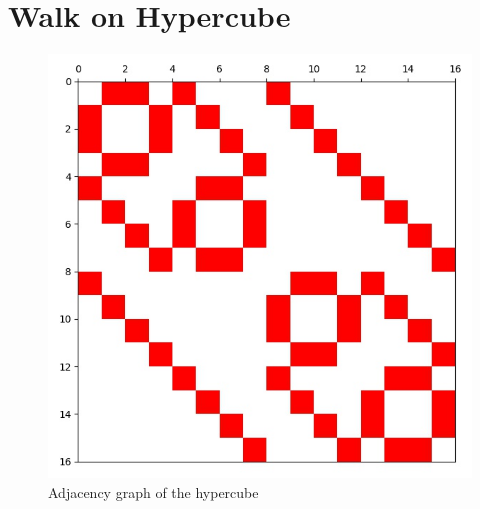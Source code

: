 \section{Walk on Hypercube}

\begin{figure}[H]
\centering
\includegraphics[width=0.5\linewidth]{./figures/results/hypercube/graph.jpg}
\caption{Adjacency graph of the hypercube}
\end{figure}


